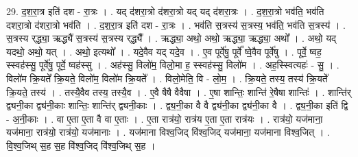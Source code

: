 \documentclass[17pt]{extarticle}
\begin{document}
29. द॒श॒रा॒त्र इति॑ दश - रा॒त्रः । . यद् द॑शरा॒त्रो द॑शरा॒त्रो यद् यद् द॑शरा॒त्रः । . द॒श॒रा॒त्रो भव॑ति॒ भव॑ति दशरा॒त्रो द॑शरा॒त्रो भव॑ति । . द॒श॒रा॒त्र इति॑ दश - रा॒त्रः । . भव॑ति स॒त्रस्य॑ स॒त्रस्य॒ भव॑ति॒ भव॑ति स॒त्रस्य॑ । . स॒त्रस्य र्‌द्ध्या॒ ऋद्ध्यै॑ स॒त्रस्य॑ स॒त्रस्य र्‌द्ध्यै᳚ । . ऋद्ध्या॒ अथो॒ अथो॒ ऋद्ध्या॒ ऋद्ध्या॒ अथो᳚ । . अथो॒ यद् यदथो॒ अथो॒ यत् । . अथो॒ इत्यथो᳚ । . यदे॒वैव यद् यदे॒व । . ए॒व पूर्वे॑षु॒ पूर्वे᳚ ष्वे॒वैव पूर्वे॑षु । . पूर्वे॒ ष्वह॒ स्स्वह॑स्सु॒ पूर्वे॑षु॒ पूर्वे॒ ष्वह॑स्सु । . अह॑स्सु॒ विलो॑म॒ विलो॒मा ह॒ स्स्वह॑स्सु॒ विलो॑म । . अह॒स्स्वित्यहः॑ - सु॒ । . विलो॑म क्रि॒यते᳚ क्रि॒यते॒ विलो॑म॒ विलो॑म क्रि॒यते᳚ । . विलो॒मेति॒ वि - लो॒म॒ । . क्रि॒यते॒ तस्य॒ तस्य॑ क्रि॒यते᳚ क्रि॒यते॒ तस्य॑ । . तस्यै॒वैव तस्य॒ तस्यै॒व । . ए॒वै षैषै वैवैषा । . ए॒षा शान्तिः॒ शान्ति॑ रे॒षैषा शान्तिः॑ । . शान्ति॑र् द्व्यनी॒का द्व्य॑नी॒काः शान्तिः॒ शान्ति॑र् द्व्यनी॒काः । . द्व्य॒नी॒का वै वै द्व्य॑नी॒का द्व्य॑नी॒का वै । . द्व्य॒नी॒का इति॑ द्वि - अ॒नी॒काः । . वा ए॒ता ए॒ता वै वा ए॒ताः । . ए॒ता रात्र॑यो॒ रात्र॑य ए॒ता ए॒ता रात्र॑यः । . रात्र॑यो॒ यज॑माना॒ यज॑माना॒ रात्र॑यो॒ रात्र॑यो॒ यज॑मानाः । . यज॑माना विश्व॒जिद् वि॑श्व॒जिद् यज॑माना॒ यज॑माना विश्व॒जित् । . वि॒श्व॒जिथ् स॒ह स॒ह वि॑श्व॒जिद् वि॑श्व॒जिथ् स॒ह । \newline
\end{document}
